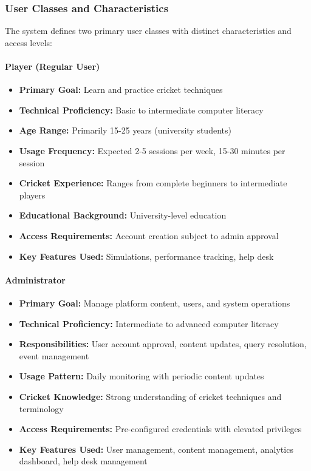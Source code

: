 \documentclass[12pt,a4paper]{article}
\begin{document}
\begin{enumerate}
\subsubsection{User Classes and Characteristics}
The system defines two primary user classes with distinct characteristics and access levels:

\paragraph{Player (Regular User)}
\begin{itemize}
    \item \textbf{Primary Goal:} Learn and practice cricket techniques
    \item \textbf{Technical Proficiency:} Basic to intermediate computer literacy
    \item \textbf{Age Range:} Primarily 15-25 years (university students)
    \item \textbf{Usage Frequency:} Expected 2-5 sessions per week, 15-30 minutes per session
    \item \textbf{Cricket Experience:} Ranges from complete beginners to intermediate players
    \item \textbf{Educational Background:} University-level education
    \item \textbf{Access Requirements:} Account creation subject to admin approval
    \item \textbf{Key Features Used:} Simulations, performance tracking, help desk
\end{itemize}

\paragraph{Administrator}
\begin{itemize}
    \item \textbf{Primary Goal:} Manage platform content, users, and system operations
    \item \textbf{Technical Proficiency:} Intermediate to advanced computer literacy
    \item \textbf{Responsibilities:} User account approval, content updates, query resolution, event management
    \item \textbf{Usage Pattern:} Daily monitoring with periodic content updates
    \item \textbf{Cricket Knowledge:} Strong understanding of cricket techniques and terminology
    \item \textbf{Access Requirements:} Pre-configured credentials with elevated privileges
    \item \textbf{Key Features Used:} User management, content management, analytics dashboard, help desk management
\end{itemize}


\end{enumerate}
\end{document}
